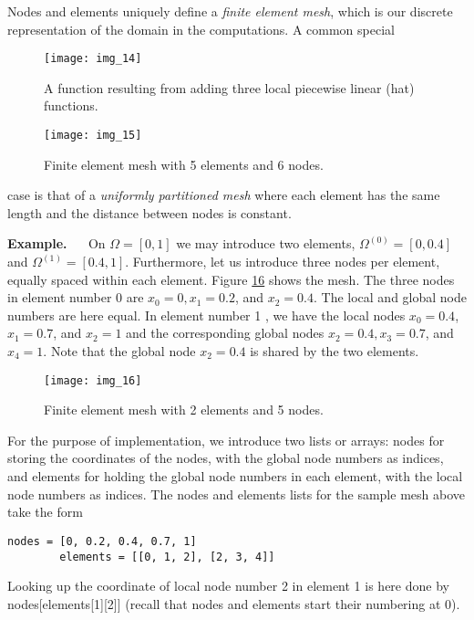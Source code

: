 \documentclass[../main.tex]{subfiles}
\begin{document}
	Nodes and elements uniquely define a \textit{finite element mesh}, which is our discrete representation of the domain in the computations. A common special
	\begin{figure}[H]
		\centering
		\texttt{[image: img\_14]}
		\caption{A function resulting from adding three local piecewise linear (hat)
			functions.}
		\label{fig:img_14}
	\end{figure}
	\begin{figure}[H]
		\centering
		\texttt{[image: img\_15]}
		\caption{Finite element mesh with 5 elements and 6 nodes.}
		\label{fig:img_15}
	\end{figure}
	
	\noindent case is that of a \textit{uniformly partitioned mesh} where each element has the same
	length and the distance between nodes is constant.
	
	\noindent \textbf{Example.} $\quad$ On $\Omega=[0,1]$ we may introduce two elements, $\Omega^{(0)}=[0,0.4]$ and $\Omega^{(1)}=[0.4,1]$. Furthermore, let us introduce three nodes per element, equally spaced within each element. Figure \hyperref[fig:img_16]{16} shows the mesh. The three nodes in element number 0 are $x_{0}=0, x_{1}=0.2$, and $x_{2}=0.4$. The local and global node numbers are here equal. In element number 1 , we have the local nodes $x_{0}=0.4$, $x_{1}=0.7$, and $x_{2}=1$ and the corresponding global nodes $x_{2}=0.4, x_{3}=0.7$, and $x_{4}=1$. Note that the global node $x_{2}=0.4$ is shared by the two elements.
	\begin{figure}[H]
		\centering
		\texttt{[image: img\_16]}
		\caption{Finite element mesh with 2 elements and 5 nodes.}
		\label{fig:img_16}
	\end{figure}
	
	For the purpose of implementation, we introduce two lists or arrays: nodes
	for storing the coordinates of the nodes, with the global node numbers as indices,
	and elements for holding the global node numbers in each element, with the
	local node numbers as indices. The nodes and elements lists for the sample
	mesh above take the form
	\begin{lstlisting}[numbers=none]
		nodes = [0, 0.2, 0.4, 0.7, 1]
		elements = [[0, 1, 2], [2, 3, 4]]	
	\end{lstlisting}
	Looking up the coordinate of local node number 2 in element 1 is here done by
	nodes[elements[1][2]] (recall that nodes and elements start their numbering
	at 0).
	
\end{document}
